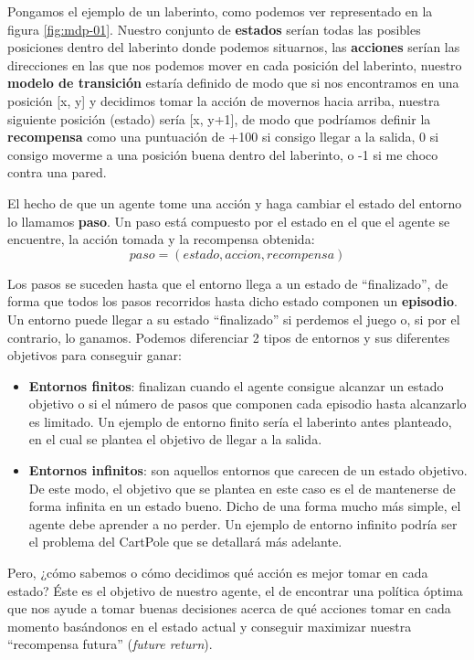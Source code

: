 Pongamos el ejemplo de un laberinto, como podemos ver representado en la figura \ref{fig:mdp-01}. Nuestro conjunto de \textbf{estados} serían todas las posibles posiciones dentro del laberinto donde podemos situarnos, las \textbf{acciones} serían las direcciones en las que nos podemos mover en cada posición del laberinto, nuestro \textbf{modelo de transición} estaría definido de modo que si nos encontramos en una posición [x, y] y decidimos tomar la acción de movernos hacia arriba, nuestra siguiente posición (estado) sería [x, y+1], de modo que podríamos definir la \textbf{recompensa} como una puntuación de +100 si consigo llegar a la salida, 0 si consigo moverme a una posición buena dentro del laberinto, o -1 si me choco contra una pared.


El hecho de que un agente tome una acción y haga cambiar el estado del entorno lo llamamos \textbf{paso}. Un paso está compuesto por el estado en el que el agente se encuentre, la acción tomada y la recompensa obtenida: $$paso = (estado, accion, recompensa)$$


Los pasos se suceden hasta que el entorno llega a un estado de “finalizado”, de forma que todos los pasos recorridos hasta dicho estado componen un \textbf{episodio}. Un entorno puede llegar a su estado “finalizado” si perdemos el juego o, si por el contrario, lo ganamos. Podemos diferenciar 2 tipos de entornos y sus diferentes objetivos para conseguir ganar:

\begin{itemize}
    \item \textbf{Entornos finitos}: finalizan cuando el agente consigue alcanzar un estado objetivo o si el número de pasos que componen cada episodio hasta alcanzarlo es limitado. Un ejemplo de entorno finito sería el laberinto antes planteado, en el cual se plantea el objetivo de llegar a la salida.
    \item \textbf{Entornos infinitos}: son aquellos entornos que carecen de un estado objetivo. De este modo, el objetivo que se plantea en este caso es el de mantenerse de forma infinita en un estado bueno. Dicho de una forma mucho más simple, el agente debe aprender a no perder. Un ejemplo de entorno infinito podría ser el problema del CartPole que se detallará más adelante.
\end{itemize}

Pero, ¿cómo sabemos o cómo decidimos qué acción es mejor tomar en cada estado? Éste es el objetivo de nuestro agente, el de encontrar una política óptima que nos ayude a tomar buenas decisiones acerca de qué acciones tomar en cada momento basándonos en el estado actual y conseguir maximizar nuestra “recompensa futura” (\textit{future return}).

